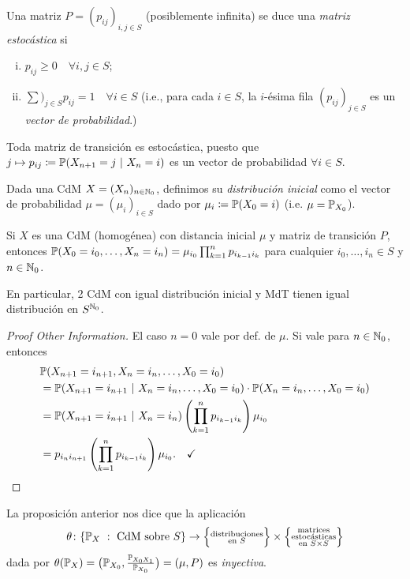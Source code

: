 \begin{definition}
	Una matriz $P = (p_{ij})_{i,j \in S}$ (posiblemente infinita) se duce una \textit{matriz estocástica} si
	\begin{enumerate}[(i)]
		\item $p_{ij} \geq 0 \quad \forall i,j \in S$;

		\item $\sum)_{j \in S} p_{ij} = 1 \quad \forall i \in S$ (i.e., para cada $i \in S$, la $i$-ésima fila $(p_{ij})_{j \in S}$ es un \textit{vector de probabilidad}.)
	\end{enumerate}
\end{definition}

\begin{remark}
	Toda matriz de transición es estocástica, puesto que $j \mapsto p_{ij} \coloneq \mbb{P}(X_{n+1} = j \ | \ X_{n} = i)$ es un vector de probabilidad $\forall i \in S$.
\end{remark}

\begin{definition}
	Dada una CdM $X = (X_{n})_{n \in \mathbb{N}_{0}}$, definimos su \textit{distribución inicial} como el vector de probabilidad $\mu = (\mu_{i})_{i \in S}$ dado por $\mu_{i} \coloneq \mathbb{P}(X_{0} = i)$ (i.e. $\mu = \mathbb{P}_{X_{0}}$).
\end{definition}

\begin{prop}
	Si $X$ es una CdM (homogénea) con distancia inicial $\mu$ y matriz de transición $P$, entonces $\mathbb{P}(X_{0} = i_{0}, \dots, X_{n} = i_{n}) = \mu_{i_{0}} \prod_{k=1}^{n} p_{i_{k-1} i_{k}}$ para cualquier $i_{0},\dots,i_{n} \in S$ y $n \in \mathbb{N}_{0}$. \par
	En particular, 2 CdM con igual distribución inicial y MdT tienen igual distribución en $S^{\mathbb{N}_{0}}$.
\end{prop}
\begin{proof}[Proof Other Information]
	El caso $n=0$ vale por def. de $\mu$. Si vale para $n \in \mathbb{N}_{0}$, entonces
	\begin{align*}
		&\mathbb{P}(X_{n+1} = i_{n+1}, X_{n} = i_{n},\dots, X_{0} = i_{0}) \\
		&= \mathbb{P}(X_{n+1} = i_{n+1} \ | \ X_{n} = i_{n}, \dots, X_{0} = i_{0}) \cdot \mathbb{P}(X_{n} = i_{n},\dots, X_{0} = i_{0}) \\
		&= \mathbb{P}(X_{n+1} = i_{n+1} \ | \ X_{n} = i_{n}) \left( \prod_{k=1}^{n} p_{i_{k-1} i_{k}} \right) \mu_{i_{0}} \\
		&= p_{i_{n} i_{n+1}} \left( \prod_{k=1}^{n} p_{i_{k-1} i_{k}} \right) \mu_{i_{0}}
	.\quad\checkmark\end{align*}
\end{proof}
\medskip
La proposición anterior nos dice que la aplicación
\[ \theta \colon \{\mathbb{P}_{X} \ : \ \text{CdM sobre } S\} \to \Big\{\substack{\text{distribuciones} \\ \text{en } S}\Big\} \times \Big\{\substack{\text{matrices} \\ \text{estocásticas} \\ \text{en } S \times S}\Big\} \]
dada por $\theta(\mathbb{P}_{X}) = \big( \mathbb{P}_{X_{0}}, \frac{\mathbb{P}_{X_{0}X_{1}}}{\mathbb{P}_{X_{0}}} \big) = (\mu, P)$ es \textit{inyectiva}.

